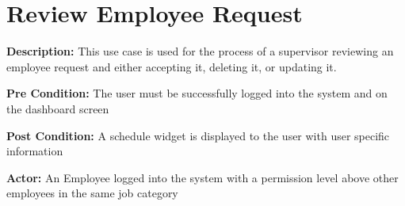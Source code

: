 \documentclass[letterpaper,12pt]{report}
\begin{document}
\section{Review Employee Request}
\begin{description}
 \item \textbf{Description:} \newline This use case is used for the process of a supervisor reviewing an employee request and either accepting it, deleting it, or updating it.
 \item \textbf{Pre Condition:} \newline The user must be successfully logged into the system and on the dashboard screen
 \item \textbf{Post Condition:} \newline A schedule widget is displayed to the user with user specific information
 \item \textbf{Actor:} \newline An Employee logged into the system with a permission level above other employees in the same job category
\end{description}
\end{document}
